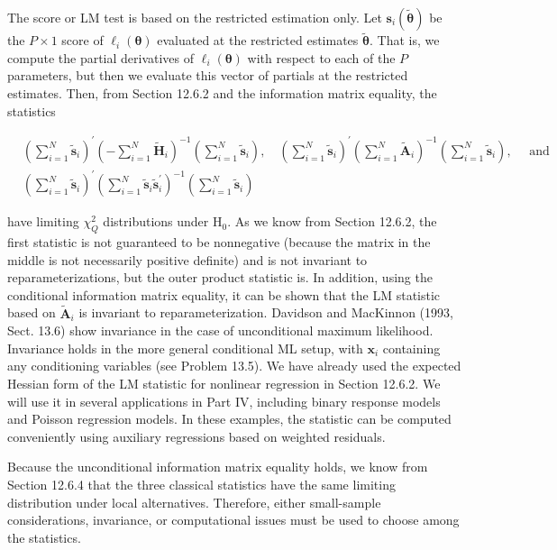 \documentclass[10pt]{article}
\begin{document}
The score or LM test is based on the restricted estimation only. Let $\mathbf{s}_{i}(\tilde{\boldsymbol{\theta}})$ be the $P \times 1$ score of $\ell_{i}(\boldsymbol{\theta})$ evaluated at the restricted estimates $\tilde{\boldsymbol{\theta}}$. That is, we compute the partial derivatives of $\ell_{i}(\boldsymbol{\theta})$ with respect to each of the $P$ parameters, but then we evaluate this vector of partials at the restricted estimates. Then, from Section 12.6.2 and the information matrix equality, the statistics


\begin{align*}
& \left(\sum_{i=1}^{N} \tilde{\mathbf{s}}_{i}\right)^{\prime}\left(-\sum_{i=1}^{N} \tilde{\mathbf{H}}_{i}\right)^{-1}\left(\sum_{i=1}^{N} \tilde{\mathbf{s}}_{i}\right), \quad\left(\sum_{i=1}^{N} \tilde{\mathbf{s}}_{i}\right)^{\prime}\left(\sum_{i=1}^{N} \tilde{\mathbf{A}}_{i}\right)^{-1}\left(\sum_{i=1}^{N} \tilde{\mathbf{s}}_{i}\right), \quad \text { and } \\
& \left(\sum_{i=1}^{N} \tilde{\mathbf{s}}_{i}\right)^{\prime}\left(\sum_{i=1}^{N} \tilde{\mathbf{s}}_{i} \tilde{\mathbf{s}}_{i}^{\prime}\right)^{-1}\left(\sum_{i=1}^{N} \tilde{\mathbf{s}}_{i}\right) \tag{13.36}
\end{align*}


have limiting $\chi_{Q}^{2}$ distributions under $\mathrm{H}_{0}$. As we know from Section 12.6.2, the first statistic is not guaranteed to be nonnegative (because the matrix in the middle is not necessarily positive definite) and is not invariant to reparameterizations, but the outer product statistic is. In addition, using the conditional information matrix equality, it can be shown that the LM statistic based on $\tilde{\mathbf{A}}_{i}$ is invariant to reparameterization. Davidson and MacKinnon (1993, Sect. 13.6) show invariance in the case of unconditional maximum likelihood. Invariance holds in the more general conditional ML setup, with $\mathbf{x}_{i}$ containing any conditioning variables (see Problem 13.5). We have already used the expected Hessian form of the LM statistic for nonlinear regression in Section 12.6.2. We will use it in several applications in Part IV, including binary response models and Poisson regression models. In these examples, the statistic can be computed conveniently using auxiliary regressions based on weighted residuals.

Because the unconditional information matrix equality holds, we know from Section 12.6.4 that the three classical statistics have the same limiting distribution under local alternatives. Therefore, either small-sample considerations, invariance, or computational issues must be used to choose among the statistics.
\end{document}
